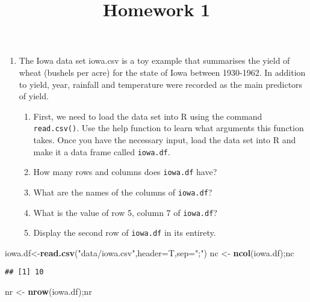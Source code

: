 \documentclass[
]{article}
\title{Homework 1}
\author{}
\date{\vspace{-2.5em}}
\newenvironment{Shaded}{\begin{snugshade}}{\end{snugshade}}
\newcommand{\DataTypeTok}[1]{\textcolor[rgb]{0.13,0.29,0.53}{#1}}
\newcommand{\KeywordTok}[1]{\textcolor[rgb]{0.13,0.29,0.53}{\textbf{#1}}}
\newcommand{\NormalTok}[1]{#1}
\newcommand{\StringTok}[1]{\textcolor[rgb]{0.31,0.60,0.02}{#1}}
\providecommand{\tightlist}{%
  \setlength{\itemsep}{0pt}\setlength{\parskip}{0pt}}
\begin{document}
\maketitle

\begin{enumerate}
\def\labelenumi{\arabic{enumi}.}
\tightlist
\item
  The Iowa data set iowa.csv is a toy example that summarises the yield
  of wheat (bushels per acre) for the state of Iowa between 1930-1962.
  In addition to yield, year, rainfall and temperature were recorded as
  the main predictors of yield.

  \begin{enumerate}
  \def\labelenumii{\alph{enumii}.}
  \tightlist
  \item
    First, we need to load the data set into R using the command
    \texttt{read.csv()}. Use the help function to learn what arguments
    this function takes. Once you have the necessary input, load the
    data set into R and make it a data frame called \texttt{iowa.df}.
  \item
    How many rows and columns does \texttt{iowa.df} have?
  \item
    What are the names of the columns of \texttt{iowa.df}?
  \item
    What is the value of row 5, column 7 of \texttt{iowa.df}?
  \item
    Display the second row of \texttt{iowa.df} in its entirety.
  \end{enumerate}
\end{enumerate}

\begin{Shaded}
\begin{Highlighting}[]
\NormalTok{iowa.df<-}\KeywordTok{read.csv}\NormalTok{(}\StringTok{"data/iowa.csv"}\NormalTok{,}\DataTypeTok{header=}\NormalTok{T,}\DataTypeTok{sep=}\StringTok{";"}\NormalTok{)}
\NormalTok{nc <-}\StringTok{ }\KeywordTok{ncol}\NormalTok{(iowa.df);nc}
\end{Highlighting}
\end{Shaded}

\begin{verbatim}
## [1] 10
\end{verbatim}

\begin{Shaded}
\begin{Highlighting}[]
\NormalTok{nr <-}\StringTok{ }\KeywordTok{nrow}\NormalTok{(iowa.df);nr}
\end{Highlighting}
\end{Shaded}
\end{document}
